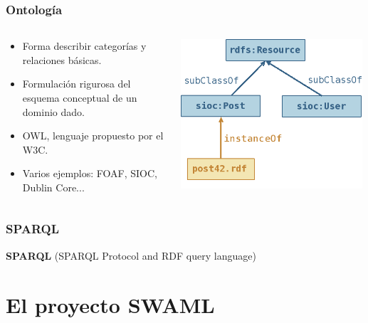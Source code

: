 \documentclass[spanish,notes=hide]{beamer}
\begin{document}
{
  \frametitle{Ontología}

  \begin{columns}
   \begin{column}{0.4\textwidth}
	\begin{itemize}
	 \item Forma describir categorías y relaciones básicas.
	 \item Formulación rigurosa del esquema conceptual de un dominio dado.
	 \item OWL, lenguaje propuesto por el W3C.
	 \item Varios ejemplos: FOAF, SIOC, Dublin Core...
	\end{itemize}
   \end{column}
   \begin{column}{0.6\textwidth}
	\includegraphics[width=0.99\textwidth]{images/ontologia.png}
   \end{column}
  \end{columns}
}
\frame
{
  \frametitle{SPARQL}

  \begin{center}
    \textbf{SPARQL} (SPARQL Protocol and RDF query language)\\
    \SPARQL
  \end{center}
}

\section{El proyecto SWAML}
\end{document}
